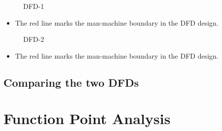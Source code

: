 \documentclass[11pt]{article}
\begin{document}
\begin{figure}[H]
    \centering
    \caption{DFD-1}
\end{figure}
\begin{itemize}
    \item The red line marks the man-machine boundary in the DFD design.
\end{itemize}
\newpage
\begin{figure}[H]
    \centering
    \caption{DFD-2}
\end{figure}

\begin{itemize}
    \item The red line marks the man-machine boundary in the DFD design.
\end{itemize}
\newpage
\subsection{Comparing the two DFDs}
\newpage
\section{Function Point Analysis}
\end{document}
